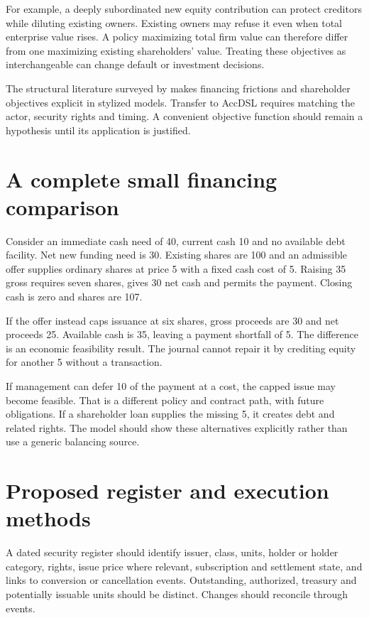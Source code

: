 For example, a deeply subordinated new equity contribution can protect creditors while diluting existing owners. Existing owners may refuse it even when total enterprise value rises. A policy maximizing total firm value can therefore differ from one maximizing existing shareholders' value. Treating these objectives as interchangeable can change default or investment decisions.

The structural literature surveyed by \citet{strebulaev2012} makes financing frictions and shareholder objectives explicit in stylized models. Transfer to AccDSL requires matching the actor, security rights and timing. A convenient objective function should remain a hypothesis until its application is justified.

\section{A complete small financing comparison}
Consider an immediate cash need of 40, current cash 10 and no available debt facility. Net new funding need is 30. Existing shares are 100 and an admissible offer supplies ordinary shares at price 5 with a fixed cash cost of 5. Raising 35 gross requires seven shares, gives 30 net cash and permits the payment. Closing cash is zero and shares are 107.

If the offer instead caps issuance at six shares, gross proceeds are 30 and net proceeds 25. Available cash is 35, leaving a payment shortfall of 5. The difference is an economic feasibility result. The journal cannot repair it by crediting equity for another 5 without a transaction.

If management can defer 10 of the payment at a cost, the capped issue may become feasible. That is a different policy and contract path, with future obligations. If a shareholder loan supplies the missing 5, it creates debt and related rights. The model should show these alternatives explicitly rather than use a generic balancing source.

\section{Proposed register and execution methods}
A dated security register should identify issuer, class, units, holder or holder category, rights, issue price where relevant, subscription and settlement state, and links to conversion or cancellation events. Outstanding, authorized, treasury and potentially issuable units should be distinct. Changes should reconcile through events.

